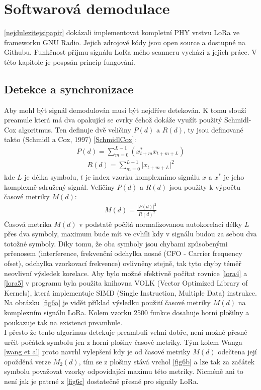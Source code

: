 \documentclass{ctuthesis}
\begin{document}
\section{Softwarová demodulace}
\ref{nejdulezitejsipapir} dokázali implementovat kompletní PHY vrstvu LoRa ve frameworku GNU Radio. Jejich zdrojové kódy jsou open source a dostupné na Githubu. Funkčnost příjmu signálu LoRa mého scanneru vychází z jejich práce. V této kapitole je pospsán princip fungování.
\subsection{Detekce a synchronizace}
\label{subsec:detection}
Aby mohl být signál demodulován musí být nejdříve detekován. K tomu slouží preamule která má dva opakující se cvrky čehož dokáže využít použitý Schmidl-Cox algoritmus. Ten definuje dvě veličiny $P(d)$ a $R(d)$, ty jsou definované takto (Schmidl a Cox, 1997) \ref{SchmidlCox}:
\begin{align}P(d) = \sum_{m=0}^{L-1} (x_{t+m}^{\ast}x_{t+m+L})
\label{eq:lora3}
\end{align}
\begin{align}
R(d) = \sum_{m=0}^{L-1} \lvert{x_{t+m+L}}\rvert^{2}
\label{eq:lora4}
\end{align}
kde $L$ je délka symbolu, $t$ je index vzorku komplexnímo signálu $x$ a $x^{\ast}$ je jeho komplexně sdružený signál. Veličiny $P(d)$ a $R(d)$ jsou použity k výpočtu časové metriky $M(d)$:
\begin{align}
M(d) = \frac{\vert P(d) \rvert ^{2}}{R(d)^{2}}
\label{eq:lora5}
\end{align}
Časová metrika $M(d)$ v podstatě počítá normalizovanou autokorelaci délky $L$ přes dva symboly, maximum bude mít ve cvhíli kdy v signálu budou za sebou dva totožné symboly. Díky tomu, že oba symboly jsou chybami způsobenými prřenosem (interference, frekvenční odchylka nosné (CFO - Carrier frequency ofset), odchylka vzorkovací frekvence) ovlivněny stejně, tak tyto chyby téměř neovlivní výsledek korelace. Aby bylo možné efektivně počítat rovnice \ref{lora4} a \ref{lora5} v programu byla použita knihovna VOLK (Vector Optimized Library of Kernels), která implementuje SIMD (Single Instruction, Multiple Data) instrukce. Na obrázku \ref{fig6a} je vidět příklad výsledku použití časové metriky $M(d)$ na komplexním signálu LoRa. Kolem vzorku 2500 funkce dosahuje horní plošilny a poukazuje tak na existenci preambule. \\
I přesto že tento algorimus detekuje preambuli velmi dobře, není možné přesně určit počátek symbolu jen z horní plošiny časové metriky. Tým kolem Wanga \ref{wang et al} proto navrhl vylepšení kdy je od časové metriky $M(d)$ odečtena její opožděná verze $M_{2}(d)$, tím se z plošiny stává vrchol \ref{fig6b} a lze tak za začátek symbolu považovat vzorky odpovídající maximu této metriky. Nicméně ani to není jak je patrné z \ref{fig6c} dostatečně přesné pro signály LoRa.\\
\end{document}

